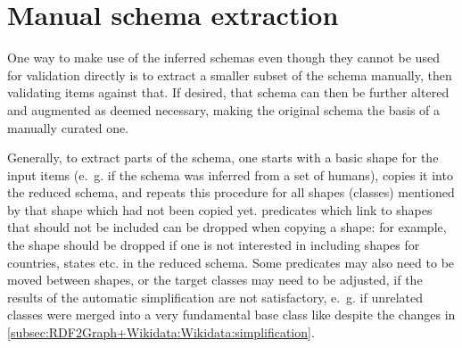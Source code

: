 
\section{Manual schema extraction}
\label{sec:Evaluation:extraction}

One way to make use of the inferred \glspl{schema}
even though they cannot be used for validation directly
is to extract a smaller subset of the \gls{schema} manually,
then validating \glspl{item} against that.
If desired, that \gls{schema} can then be further altered and augmented as deemed necessary,
making the original \gls{schema} the basis of a manually curated one.

Generally, to extract parts of the \gls{schema},
one starts with a basic \gls{shape} for the input \glspl{item}
(e.~g.  if the \gls{schema} was inferred from a set of humans),
copies it into the reduced \gls{schema},
and repeats this procedure for all \glspl{shape} (classes) mentioned by that \gls{shape} which had not been copied yet.
\Glspl{predicate} which link to \glspl{shape} that should not be included can be dropped when copying a \gls{shape}:
for example, the  \gls{shape} should be dropped
if one is not interested in including \glspl{shape} for countries, states etc. in the reduced \gls{schema}.
Some \glspl{predicate} may also need to be moved between \glspl{shape},
or the target classes may need to be adjusted,
if the results of the automatic simplification are not satisfactory,
e.~g. if unrelated classes were merged into a very fundamental base class like 
despite the changes in \cref{subsec:RDF2Graph+Wikidata:Wikidata:simplification}.

